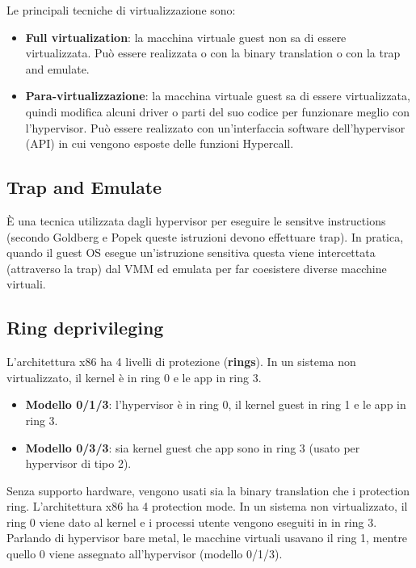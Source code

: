 \documentclass[11pt,a4paper]{report}
\begin{document}
Le principali tecniche di virtualizzazione sono:
\begin{itemize}
    \item \textbf{Full virtualization}: la macchina virtuale guest non sa di essere virtualizzata. Può essere realizzata o con la binary translation o con la trap and emulate.
    \item \textbf{Para-virtualizzazione}: la macchina virtuale guest sa di essere virtualizzata, quindi modifica alcuni driver o parti del suo codice per funzionare meglio con l'hypervisor. Può essere realizzato con un'interfaccia software dell'hypervisor (API) in cui vengono esposte delle funzioni Hypercall.
\end{itemize}

\subsection{Trap and Emulate}

È una tecnica utilizzata dagli hypervisor per eseguire le sensitve instructions (secondo Goldberg e Popek queste istruzioni devono effettuare trap). In pratica, quando il guest OS esegue un'istruzione sensitiva questa viene intercettata (attraverso la trap) dal VMM ed emulata per far coesistere diverse macchine virtuali.

\subsection{Ring deprivileging}

L'architettura x86 ha 4 livelli di protezione (\textbf{rings}). In un sistema non virtualizzato, il kernel è in ring 0 e le app in ring 3.
\begin{itemize}
    \item \textbf{Modello 0/1/3}: l'hypervisor è in ring 0, il kernel guest in ring 1 e le app in ring 3.
    \item \textbf{Modello 0/3/3}: sia kernel guest che app sono in ring 3 (usato per hypervisor di tipo 2).
\end{itemize}

Senza supporto hardware, vengono usati sia la binary translation che i protection ring. L'architettura x86 ha 4 protection mode. In un sistema non virtualizzato, il ring 0 viene dato al kernel e i processi utente vengono eseguiti in in ring 3. Parlando di hypervisor bare metal, le macchine virtuali usavano il ring 1, mentre quello 0 viene assegnato all'hypervisor (modello 0/1/3).
\end{document}
